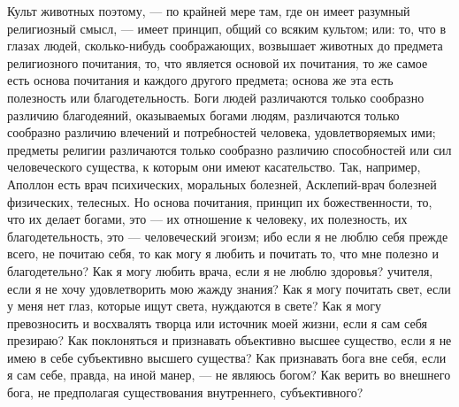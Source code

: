 \documentclass[12pt]{article}
\begin{document}
Культ животных поэтому, --- по крайней мере там, где он имеет разумный религиозный смысл, --- имеет принцип, общий со всяким культом; или: то, что в глазах людей, сколько-нибудь соображающих, возвышает животных до предмета религиозного почитания, то, что является основой их почитания, то же самое есть основа почитания и каждого другого предмета; основа же эта есть полезность или благодетельность. Боги людей различаются только сообразно различию благодеяний, оказываемых богами людям, различаются только сообразно различию влечений и потребностей человека, удовлетворяемых ими; предметы религии различаются только сообразно различию способностей или сил человеческого существа, к которым они имеют касательство. Так, например, Аполлон есть врач психических, моральных болезней, Асклепий-врач болезней физических, телесных. Но основа почитания, принцип их божественности, то, что их делает богами, это --- их отношение к человеку, их полезность, их благодетельность, это --- человеческий эгоизм; ибо если я не люблю себя прежде всего, не почитаю себя, то как могу я любить и почитать то, что мне полезно и благодетельно? Как я могу любить врача, если я не люблю здоровья? учителя, если я не хочу удовлетворить мою жажду знания? Как я могу почитать свет, если у меня нет глаз, которые ищут света, нуждаются в свете? Как я могу превозносить и восхвалять творца или источник моей жизни, если я сам себя презираю? Как поклоняться и признавать объективно высшее существо, если я не имею в себе субъективно высшего существа? Как признавать бога вне себя, если я сам себе, правда, на иной манер, --- не являюсь богом? Как верить во внешнего бога, не предполагая существования внутреннего, субъективного? 
\end{document}
